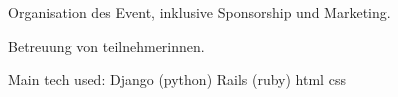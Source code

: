 \documentclass[a4paper]{deedy-resume_twopage} %
\begin{document}
\begin{minipage}[t]{0.66\textwidth}
  \sectionspace %


  \begin{tightitemize}
  \item Organisation des Event, inklusive Sponsorship und Marketing.
  \item Betreuung von teilnehmerinnen.
  \end{tightitemize}
  Main tech used: \textbullet{} Django (python) \textbullet{} Rails (ruby) \textbullet{} html \textbullet{} css

  \sectionspace %




\end{minipage}
\end{document}
